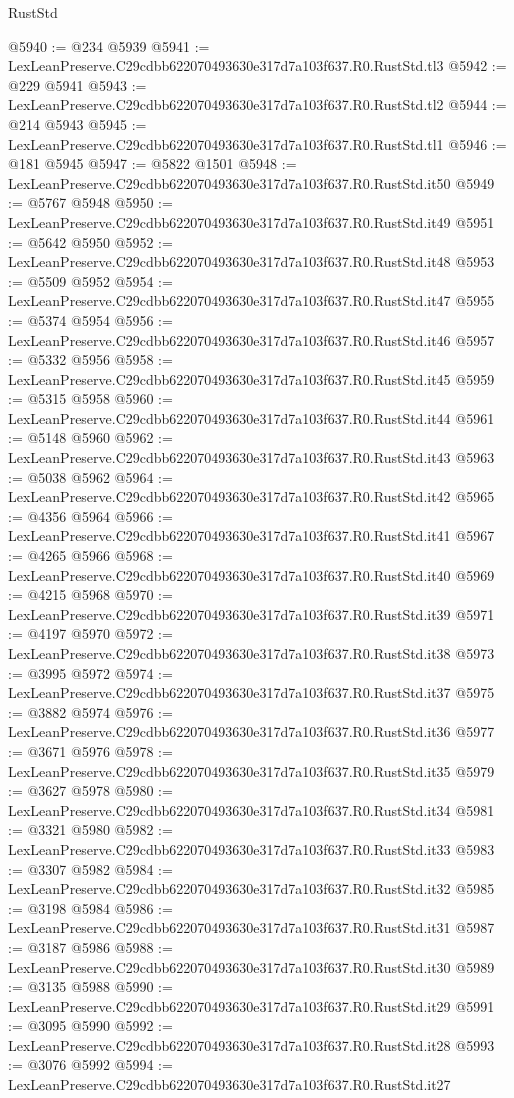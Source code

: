 \begin{lexlean}{RustStd}
\begin{coremodule}
@5940 := @234 @5939
@5941 := LexLeanPreserve.C29cdbb622070493630e317d7a103f637.R0.RustStd.tl3
@5942 := @229 @5941
@5943 := LexLeanPreserve.C29cdbb622070493630e317d7a103f637.R0.RustStd.tl2
@5944 := @214 @5943
@5945 := LexLeanPreserve.C29cdbb622070493630e317d7a103f637.R0.RustStd.tl1
@5946 := @181 @5945
@5947 := @5822 @1501
@5948 := LexLeanPreserve.C29cdbb622070493630e317d7a103f637.R0.RustStd.it50
@5949 := @5767 @5948
@5950 := LexLeanPreserve.C29cdbb622070493630e317d7a103f637.R0.RustStd.it49
@5951 := @5642 @5950
@5952 := LexLeanPreserve.C29cdbb622070493630e317d7a103f637.R0.RustStd.it48
@5953 := @5509 @5952
@5954 := LexLeanPreserve.C29cdbb622070493630e317d7a103f637.R0.RustStd.it47
@5955 := @5374 @5954
@5956 := LexLeanPreserve.C29cdbb622070493630e317d7a103f637.R0.RustStd.it46
@5957 := @5332 @5956
@5958 := LexLeanPreserve.C29cdbb622070493630e317d7a103f637.R0.RustStd.it45
@5959 := @5315 @5958
@5960 := LexLeanPreserve.C29cdbb622070493630e317d7a103f637.R0.RustStd.it44
@5961 := @5148 @5960
@5962 := LexLeanPreserve.C29cdbb622070493630e317d7a103f637.R0.RustStd.it43
@5963 := @5038 @5962
@5964 := LexLeanPreserve.C29cdbb622070493630e317d7a103f637.R0.RustStd.it42
@5965 := @4356 @5964
@5966 := LexLeanPreserve.C29cdbb622070493630e317d7a103f637.R0.RustStd.it41
@5967 := @4265 @5966
@5968 := LexLeanPreserve.C29cdbb622070493630e317d7a103f637.R0.RustStd.it40
@5969 := @4215 @5968
@5970 := LexLeanPreserve.C29cdbb622070493630e317d7a103f637.R0.RustStd.it39
@5971 := @4197 @5970
@5972 := LexLeanPreserve.C29cdbb622070493630e317d7a103f637.R0.RustStd.it38
@5973 := @3995 @5972
@5974 := LexLeanPreserve.C29cdbb622070493630e317d7a103f637.R0.RustStd.it37
@5975 := @3882 @5974
@5976 := LexLeanPreserve.C29cdbb622070493630e317d7a103f637.R0.RustStd.it36
@5977 := @3671 @5976
@5978 := LexLeanPreserve.C29cdbb622070493630e317d7a103f637.R0.RustStd.it35
@5979 := @3627 @5978
@5980 := LexLeanPreserve.C29cdbb622070493630e317d7a103f637.R0.RustStd.it34
@5981 := @3321 @5980
@5982 := LexLeanPreserve.C29cdbb622070493630e317d7a103f637.R0.RustStd.it33
@5983 := @3307 @5982
@5984 := LexLeanPreserve.C29cdbb622070493630e317d7a103f637.R0.RustStd.it32
@5985 := @3198 @5984
@5986 := LexLeanPreserve.C29cdbb622070493630e317d7a103f637.R0.RustStd.it31
@5987 := @3187 @5986
@5988 := LexLeanPreserve.C29cdbb622070493630e317d7a103f637.R0.RustStd.it30
@5989 := @3135 @5988
@5990 := LexLeanPreserve.C29cdbb622070493630e317d7a103f637.R0.RustStd.it29
@5991 := @3095 @5990
@5992 := LexLeanPreserve.C29cdbb622070493630e317d7a103f637.R0.RustStd.it28
@5993 := @3076 @5992
@5994 := LexLeanPreserve.C29cdbb622070493630e317d7a103f637.R0.RustStd.it27

\end{coremodule}
\end{lexlean}
